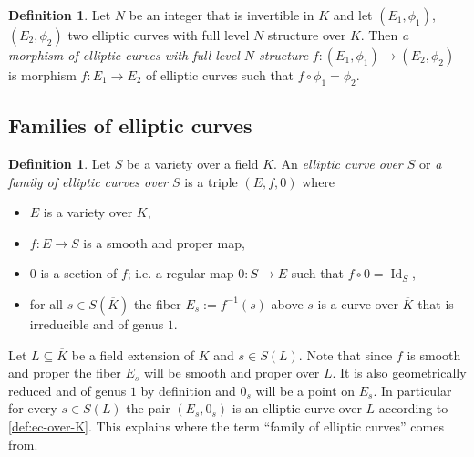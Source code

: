 \documentclass[a4paper,12pt,reqno]{amsart}
\DeclareMathOperator{\id}{Id}
\theoremstyle{definition}
\newtheorem{definition}[lemma]{Definition}
\numberwithin{lemma}{section}
\numberwithin{equation}{section}
\numberwithin{figure}{section}
\begin{document}
\begin{definition}
Let $N$ be an integer that is invertible in $K$ and let $(E_1,\phi_1)$, $(E_2,\phi_2)$ two elliptic curves with full level $N$ structure over $K$. Then \textit{a morphism of elliptic curves with full level $N$ structure}  $f: (E_1,\phi_1) \to (E_2,\phi_2)$ is morphism $f: E_1 \to E_2$ of elliptic curves such that $f \circ \phi_1 = \phi_2$.
\end{definition}



\subsection{Families of elliptic curves}

\begin{definition}\label{def:ec-over-var}
Let $S$ be a variety over a field $K$. An \textit{elliptic curve over $S$} or \textit{a family of elliptic curves over $S$} is a triple $(E,f,0)$ where
\begin{itemize}[label=-]
	\item $E$ is a variety over $K$,
	\item $f : E \to S$ is a smooth and proper map,
	\item $0$ is a section of $f$; i.e.  a regular map $0: S \to E$ such that $f \circ 0 = \id_S$,
	\item for all $s \in S(\overline K)$ the fiber $E_{s} := f^{-1}(s)$ above $s$ is a curve over $\overline K$ that is irreducible  and of genus $1$.
\end{itemize}
\end{definition}

Let $L \subseteq \overline K$ be a field extension of $K$ and $s \in S(L)$. Note that since $f$ is smooth and proper the fiber $E_s$ will be smooth and proper over $L$. It is also geometrically reduced and of genus $1$ by definition and $0_s$ will be a point on $E_s$. In particular for every  $s \in S(L)$ the pair $(E_s,0_s)$ is an elliptic curve over $L$ according to \cref{def:ec-over-K}. This explains where the term ``family of elliptic curves'' comes from.
\end{document}
